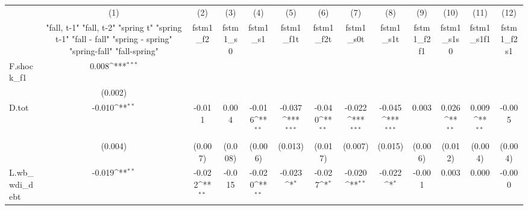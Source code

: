 {
\def\sym#1{\ifmmode^{#1}\else\(^{#1}\)\fi}
\begin{tabular}{l*{12}{c}}
\toprule
            &\multicolumn{1}{c}{(1)}&\multicolumn{1}{c}{(2)}&\multicolumn{1}{c}{(3)}&\multicolumn{1}{c}{(4)}&\multicolumn{1}{c}{(5)}&\multicolumn{1}{c}{(6)}&\multicolumn{1}{c}{(7)}&\multicolumn{1}{c}{(8)}&\multicolumn{1}{c}{(9)}&\multicolumn{1}{c}{(10)}&\multicolumn{1}{c}{(11)}&\multicolumn{1}{c}{(12)}\\
            &\multicolumn{1}{c}{  "fall, t-1" "fall, t-2" "spring t" "spring t-1"  "fall - fall" "spring - spring" "spring-fall" "fall-spring" }&\multicolumn{1}{c}{fstm1\_f2}&\multicolumn{1}{c}{fstm1\_s0}&\multicolumn{1}{c}{fstm1\_s1}&\multicolumn{1}{c}{fstm1\_f1t}&\multicolumn{1}{c}{fstm1\_f2t}&\multicolumn{1}{c}{fstm1\_s0t}&\multicolumn{1}{c}{fstm1\_s1t}&\multicolumn{1}{c}{fstm1\_f2f1}&\multicolumn{1}{c}{fstm1\_s1s0}&\multicolumn{1}{c}{fstm1\_s1f1}&\multicolumn{1}{c}{fstm1\_f2s1}\\
\midrule
F.shock\_f1  &       0.008\sym{***}&                     &                     &                     &                     &                     &                     &                     &                     &                     &                     &                     \\
            &     (0.002)         &                     &                     &                     &                     &                     &                     &                     &                     &                     &                     &                     \\
\addlinespace
D.tot       &      -0.010\sym{**} &      -0.011         &       0.004         &      -0.016\sym{**} &      -0.037\sym{***}&      -0.040\sym{**} &      -0.022\sym{***}&      -0.045\sym{***}&       0.003         &       0.026\sym{**} &       0.009\sym{**} &      -0.005         \\
            &     (0.004)         &     (0.007)         &     (0.008)         &     (0.006)         &     (0.013)         &     (0.017)         &     (0.007)         &     (0.015)         &     (0.006)         &     (0.012)         &     (0.004)         &     (0.004)         \\
\addlinespace
L.wb\_wdi\_debt&      -0.019\sym{**} &      -0.022\sym{**} &      -0.015         &      -0.020\sym{**} &      -0.023\sym{*}  &      -0.027\sym{*}  &      -0.020\sym{**} &      -0.022\sym{*}  &      -0.001         &       0.003         &       0.000         &      -0.000         \\

\end{tabular}}
